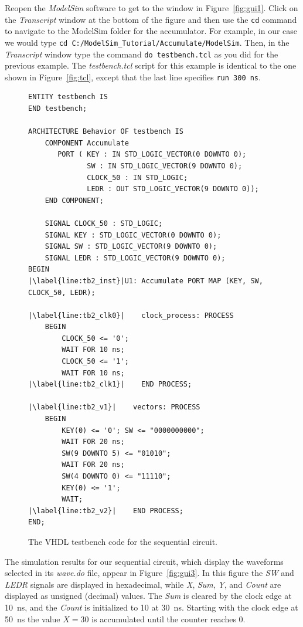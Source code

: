 \documentclass[11pt, twoside, pdftex]{article}
\begin{document}
\noindent
Reopen the {\it ModelSim} software to get to the window in Figure~\ref{fig:gui1}.
Click on the {\it Transcript} window at the bottom of the figure and then use the
\texttt{cd} command to navigate to the ModelSim folder for the accumulator. For 
example, in our case we would type 
\texttt{cd C:/ModelSim\_Tutorial/Accumulate/ModelSim}. 
Then, in the {\it Transcript} window type the command \texttt{do testbench.tcl} as you
did for the previous example. The {\it testbench.tcl} script for this example is identical
to the one shown in Figure~\ref{fig:tcl}, except that the last line specifies
\texttt{run 300 ns}.

\lstset{language=VHDL,numbers=left,escapechar=|}
\begin{figure}[h!]
\begin{center}
\begin{minipage}[t]{15 cm}
\begin{lstlisting}[name=testbench2]
ENTITY testbench IS
END testbench;
 
ARCHITECTURE Behavior OF testbench IS
    COMPONENT Accumulate
       PORT ( KEY : IN STD_LOGIC_VECTOR(0 DOWNTO 0);
              SW : IN STD_LOGIC_VECTOR(9 DOWNTO 0);  
              CLOCK_50 : IN STD_LOGIC;
              LEDR : OUT STD_LOGIC_VECTOR(9 DOWNTO 0));
    END COMPONENT;

    SIGNAL CLOCK_50 : STD_LOGIC;
    SIGNAL KEY : STD_LOGIC_VECTOR(0 DOWNTO 0);
    SIGNAL SW : STD_LOGIC_VECTOR(9 DOWNTO 0);
    SIGNAL LEDR : STD_LOGIC_VECTOR(9 DOWNTO 0);
BEGIN
|\label{line:tb2_inst}|U1: Accumulate PORT MAP (KEY, SW, CLOCK_50, LEDR);

|\label{line:tb2_clk0}|    clock_process: PROCESS
    BEGIN
        CLOCK_50 <= '0';
        WAIT FOR 10 ns;
        CLOCK_50 <= '1';
        WAIT FOR 10 ns;
|\label{line:tb2_clk1}|    END PROCESS;

|\label{line:tb2_v1}|    vectors: PROCESS
    BEGIN
        KEY(0) <= '0'; SW <= "0000000000"; 
        WAIT FOR 20 ns;
        SW(9 DOWNTO 5) <= "01010";
        WAIT FOR 20 ns;
        SW(4 DOWNTO 0) <= "11110"; 
        KEY(0) <= '1';
        WAIT;
|\label{line:tb2_v2}|    END PROCESS;
END;
\end{lstlisting}
\end{minipage}
\caption{The VHDL testbench code for the sequential circuit.}
\label{fig:tb2}
\end{center}
\end{figure}

\noindent
The simulation results for our sequential circuit, which display the waveforms selected in its
{\it wave.do} file, appear in Figure~\ref{fig:gui3}. In this figure the {\it SW} and 
{\it LEDR} signals are displayed in hexadecimal, while {\it X}, {\it Sum}, {\it Y}, and {\it
Count} are displayed as unsigned (decimal) values. The {\it Sum} is cleared by the 
clock edge at 10~ns, and the {\it Count} is initialized to 10 at 30~ns. Starting with the clock
edge at 50~ns the value $X=30$ is accumulated until the counter reaches 0.
\end{document}

